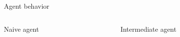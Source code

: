 \documentclass[bigger]{beamer}
\begin{document}
\begin{frame}[label={sec:orgffc63ac}]{Agent behavior}
\begin{columns}
\begin{column}[t]{0.33\columnwidth}
\begin{center}
\small
Naive agent\\[1em]
\end{center}
\end{column}
\begin{column}[t]{0.33\columnwidth}
\begin{center}
\small
Intermediate agent\\[1em]

\end{center}
\end{column}
\end{columns}
\end{frame}
\end{document}

